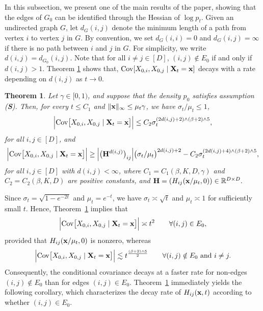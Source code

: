 \documentclass[11pt,a4paper,final]{article}
\numberwithin{equation}{section}
\newtheorem{theorem}{Theorem}[section]
\theoremstyle{remark}
\newcommand{\bH}{{\bf H}}
\newcommand{\bS}{{\bf S}}
\newcommand{\bx}{{\bf x}}
\newcommand{\bX}{{\bf X}}
\newcommand{\bbR}{{\mathbb R}}
\newcommand{\bean}{\setlength\arraycolsep{1pt}\begin{eqnarray*}}
\newcommand{\eean}{\end{eqnarray*}}
\begin{document}
In this subsection, we present one of the main results of the paper, showing that the edges of $G_{0}$ can be identified through the Hessian of $\log p_{t}$.
Given an undirected graph $G$, 
let $d_{G}(i,j)$ denote the minimum length of a path from vertex $i$ to vertex $j$ in $G$.
By convention, we set $d_{G}(i, i) = 0$ and $d_{G}(i, j) = \infty$ if there is no path between $i$ and $j$ in $G$.
For simplicity, we write $d(i,j) = d_{G_{0}}(i,j)$.
Note that for all $i \neq j \in [D]$,
$ (i,j) \notin E_{0} $
if and only if
$ d(i,j) > 1 $.
Theorem \ref{thm1} shows that, ${\rm{Cov}} [ X_{0,i}, X_{0,j} \mid \bX_{t} = \bx ]$ decays with a rate depending on $d(i, j)$ as $t \to 0$.

\begin{theorem}
\label{thm1}
Let $\gamma \in [0,1)$, and suppose that the density $p_{0}$ satisfies assumption (\bS). 
Then, for every $t \leq C_{1}$ and $\| \bx \|_{\infty} \leq \mu_t \gamma$, we have $\sigma_{t} / \mu_{t} \leq 1$,
\bean
\Big\vert  {\rm{Cov}} \big[ X_{0,i}, X_{0,j} \mid \bX_{t} = \bx \big] \Big\vert
\leq  C_{2}  \sigma_{t}^{ ( 2 d(i,j) + 2 ) \wedge (\beta + 2) \wedge 5  },
\eean
for all $i,j \in [D]$, and
\bean
\Big\vert  {\rm{Cov}} \big[ X_{0,i}, X_{0,j} \mid \bX_{t} = \bx \big] \Big\vert
\geq
\Big\vert \big( \bH^{d(i,j)} \big)_{ij} \Big\vert \big( \sigma_{t} / \mu_{t} \big)^{2 d (i,j) + 2 }
 - C_{2} \sigma_{t}^{ ( 2 d(i,j) + 4 ) \wedge (\beta + 2) \wedge 5 },
\eean
for all $i,j \in [D]$ with $d(i,j) < \infty$, where $C_{1} = C_{1} ( \beta,K,D, \gamma) $ and $C_{2} = C_{2} (\beta,K,D) $ are positive constants, and
$
\bH = ( H_{ij} ( \bx / \mu_{t} , 0 ) ) \in \bbR^{D \times D}.
$
\end{theorem}

Since $\sigma_{t} = \sqrt{1-e^{-2t}}$ and $\mu_{t} = e^{-t}$, we have $\sigma_{t} \asymp \sqrt{t}$ and $\mu_{t} \asymp 1$ for sufficiently small $t$.
Hence, Theorem~\ref{thm1} implies that
\bean
\Big\vert  {\rm{Cov}} \big[ X_{0,i}, X_{0,j} \mid \bX_{t} = \bx \big] \Big\vert
\asymp t^{2} \qquad \forall (i,j) \in E_{0},
\eean
provided that $H_{ij}(\bx / \mu_{t}, 0)$ is nonzero, whereas
\bean
\Big\vert  {\rm{Cov}} \big[ X_{0,i}, X_{0,j} \mid \bX_{t} = \bx \big] \Big\vert
\lesssim t^{\frac{ (\beta+2) \wedge 5}{2}} \qquad \forall (i,j) \notin E_{0} \text{ and } i \neq j.
\eean
Consequently, the conditional covariance decays at a faster rate for non-edges $(i,j) \notin E_{0}$ than for edges $(i,j) \in E_{0}$.
Theorem~\ref{thm1} immediately yields the following corollary, which characterizes the decay rate of $H_{ij}(\bx,t)$ according to whether $(i,j) \in E_{0}$.
\end{document}

